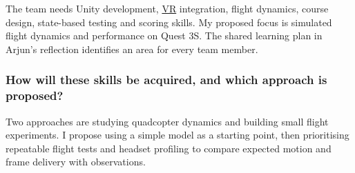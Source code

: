\documentclass[12pt]{article}
\begin{document}
The team needs Unity development, \hyperlink{glos:VR}{VR} integration, flight dynamics, course design, state-based testing and scoring skills. My proposed focus is simulated flight dynamics and performance on Quest 3S. The shared learning plan in Arjun's reflection identifies an area for every team member.

\subsubsection*{How will these skills be acquired, and which approach is proposed?}

Two approaches are studying quadcopter dynamics and building small flight experiments. I propose using a simple model as a starting point, then prioritising repeatable flight tests and headset profiling to compare expected motion and frame delivery with observations.
\end{document}
